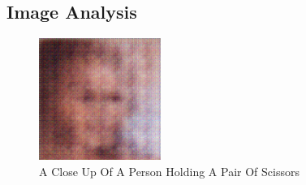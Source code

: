 \documentclass{article}%
\begin{document}
%
\subsection{Image Analysis}%
\label{subsec:ImageAnalysis}%


\begin{figure}[h!]%
\centering%
\includegraphics[width=150px]{500_fake_images/samples_5_237.png}%
\caption{A Close Up Of A Person Holding A Pair Of Scissors}%
\end{figure}

%
\end{document}
